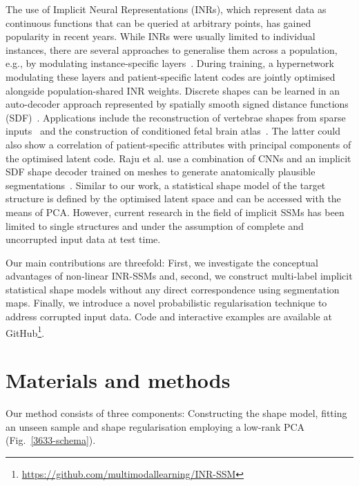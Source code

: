 The use of Implicit Neural Representations (INRs), which represent data as continuous functions that can be queried at arbitrary points, has gained popularity in recent years. While INRs were usually limited to individual instances, there are several approaches to generalise them across a population, e.g., by modulating instance-specific layers~\citep{kim2023generalizable}. During training, a hypernetwork modulating these layers and patient-specific latent codes are jointly optimised alongside population-shared INR weights. Discrete shapes can be learned in an auto-decoder approach represented by spatially smooth signed distance functions (SDF)~\citep{park2019deepsdf}. Applications include the reconstruction of vertebrae shapes from sparse inputs~\citep{amiranashvili2022learning} and the construction of conditioned fetal brain atlas~\citep{dannecker2024cina}. The latter could also show a correlation of patient-specific attributes with principal components of the optimised latent code. Raju et al. use a combination of CNNs and an implicit SDF shape decoder trained on meshes to generate anatomically plausible segmentations~\citep{raju2022deep}. Similar to our work, a statistical shape model of the target structure is defined by the optimised latent space and can be accessed with the means of PCA. However, current research in the field of implicit SSMs has been limited to single structures and under the assumption of complete and uncorrupted input data at test time. 

Our main contributions are threefold: First, we investigate the conceptual advantages of non-linear INR-SSMs and, second, we construct multi-label implicit statistical shape models without any direct correspondence using segmentation maps. Finally, we introduce a novel probabilistic regularisation technique to address corrupted input data. Code and interactive examples are available at GitHub\footnote{\url{https://github.com/multimodallearning/INR-SSM}}.





\section{Materials and methods}
\label{3633-mm}
Our method consists of three components: Constructing the shape model, fitting an unseen sample and shape regularisation employing a low-rank PCA (Fig.~\ref{3633-schema}).

